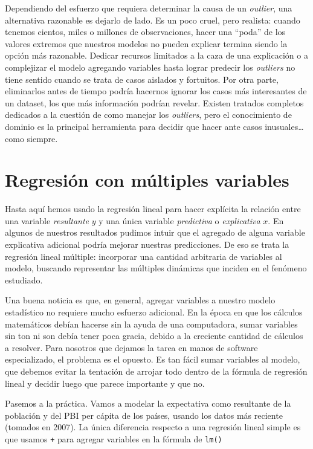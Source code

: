 \documentclass[spanish,]{book}
\begin{document}
Dependiendo del esfuerzo que requiera determinar la causa de un \emph{outlier}, una alternativa razonable es dejarlo de lado. Es un poco cruel, pero realista: cuando tenemos cientos, miles o millones de observaciones, hacer una ``poda'' de los valores extremos que nuestros modelos no pueden explicar termina siendo la opción más razonable. Dedicar recursos limitados a la caza de una explicación o a complejizar el modelo agregando variables hasta lograr predecir los \emph{outliers} no tiene sentido cuando se trata de casos aislados y fortuitos. Por otra parte, eliminarlos antes de tiempo podría hacernos ignorar los casos más interesantes de un dataset, los que más información podrían revelar. Existen tratados completos dedicados a la cuestión de como manejar los \emph{outliers}, pero el conocimiento de dominio es la principal herramienta para decidir que hacer ante casos inusuales\ldots{} como siempre.

\hypertarget{regresiuxf3n-con-muxfaltiples-variables}{%
\section{Regresión con múltiples variables}\label{regresiuxf3n-con-muxfaltiples-variables}}

Hasta aquí hemos usado la regresión lineal para hacer explícita la relación entre una variable \emph{resultante} \(y\) y una única variable \emph{predictiva} o \emph{explicativa} \(x\). En algunos de nuestros resultados pudimos intuir que el agregado de alguna variable explicativa adicional podría mejorar nuestras predicciones. De eso se trata la regresión lineal múltiple: incorporar una cantidad arbitraria de variables al modelo, buscando representar las múltiples dinámicas que inciden en el fenómeno estudiado.

Una buena noticia es que, en general, agregar variables a nuestro modelo estadístico no requiere mucho esfuerzo adicional. En la época en que los cálculos matemáticos debían hacerse sin la ayuda de una computadora, sumar variables sin ton ni son debía tener poca gracia, debido a la creciente cantidad de cálculos a resolver. Para nosotros que dejamos la tarea en manos de software especializado, el problema es el opuesto. Es tan fácil sumar variables al modelo, que debemos evitar la tentación de arrojar todo dentro de la fórmula de regresión lineal y decidir luego que parece importante y que no.

Pasemos a la práctica. Vamos a modelar la expectativa como resultante de la población y del PBI per cápita de los países, usando los datos más reciente (tomados en 2007). La única diferencia respecto a una regresión lineal simple es que usamos \texttt{+} para agregar variables en la fórmula de \texttt{lm()}
\end{document}
